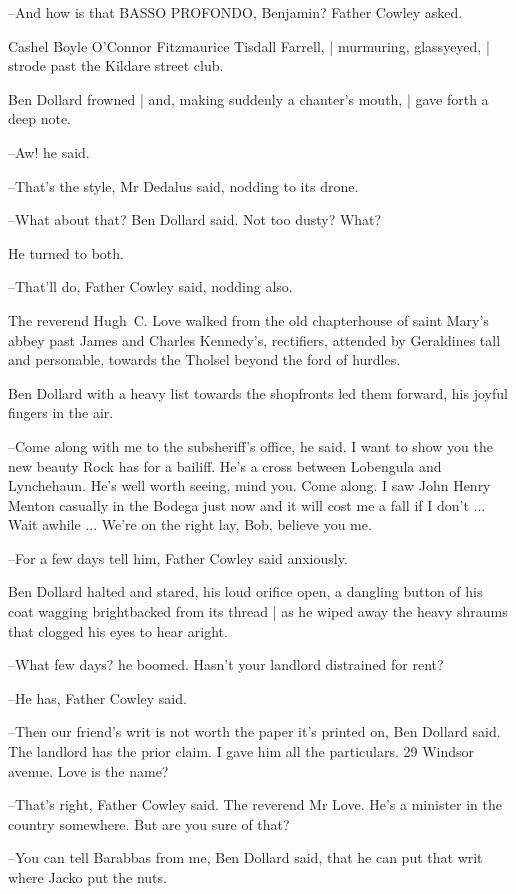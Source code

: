 --And how is that BASSO PROFONDO, Benjamin?
Father Cowley asked.

Cashel Boyle O'Connor Fitzmaurice Tisdall Farrell, |
murmuring, glassyeyed, |
strode past the Kildare street club.

Ben Dollard frowned |
and, making suddenly a chanter's mouth, |
gave forth a deep note.

--Aw!
he said.

--That's the style,
Mr Dedalus said,
nodding to its drone.

--What about that?
Ben Dollard said.
Not too dusty?
What?

He turned to both.

--That'll do,
Father Cowley said,
nodding also.

The reverend Hugh~C. Love
walked from the old chapterhouse of saint Mary's abbey
past James and Charles Kennedy's, rectifiers,
attended by Geraldines tall and personable,
towards the Tholsel beyond the ford of hurdles.

Ben Dollard
with a heavy list towards the shopfronts
led them forward,
his joyful fingers in the air.

--Come along with me to the subsheriff's office,
he said.
I want to show
you the new beauty Rock has for a bailiff.
He's a cross between Lobengula
and Lynchehaun.
He's well worth seeing, mind you.
Come along.
I saw John
Henry Menton casually in the Bodega just now
and it will cost me a fall
if I don't ...
Wait awhile ...
We're on the right lay, Bob, believe you
me.

--For a few days tell him,
Father Cowley said anxiously.

Ben Dollard halted and stared,
his loud orifice open,
a dangling button of his coat wagging brightbacked from its thread |
as he wiped away the heavy shraums that clogged his eyes
to hear aright.

--What few days?
he boomed.
Hasn't your landlord distrained for rent?

--He has,
Father Cowley said.

--Then our friend's writ is not worth the paper it's printed on,
Ben
Dollard said.
The landlord has the prior claim.
I gave him all the
particulars.
29 Windsor avenue.
Love is the name?

--That's right,
Father Cowley said.
The reverend Mr Love.
He's a minister
in the country somewhere.
But are you sure of that?

--You can tell Barabbas from me,
Ben Dollard said,
that he can put that writ where Jacko put the nuts.

